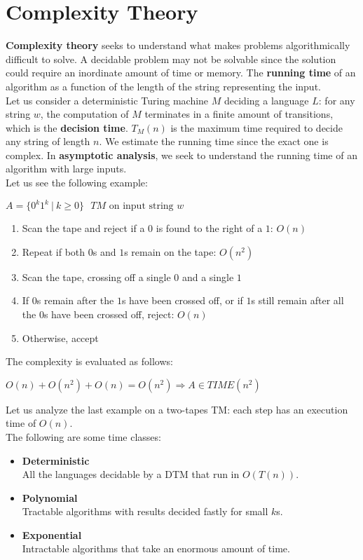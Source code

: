 \documentclass{article}
\begin{document}
\section{Complexity Theory}
\textbf{Complexity theory} seeks to understand what makes problems algorithmically difficult to solve. A decidable problem may not be solvable since the solution could require an inordinate amount of time or memory. The \textbf{running time} of an algorithm as a function of the length of the string representing the input. \\
Let us consider a deterministic Turing machine $M$ deciding a language $L$: for any string $w$, the computation of $M$ terminates in a finite amount of transitions, which is the \textbf{decision time}. $T_M(n)$ is the maximum time required to decide any string of length $n$. We estimate the running time since the exact one is complex. In \textbf{asymptotic analysis}, we seek to understand the running time of an algorithm with large inputs. \\
Let us see the following example:
\begin{center}
    $A = \{0^k1^k\ |\ k \geq 0\} \ \ \ TM \text{ on input string } w$
\end{center}
\begin{enumerate}
    \item Scan the tape and reject if a $0$ is found to the right of a $1$: $O(n)$
    \item Repeat if both $0$s and $1$s remain on the tape: $O(n^2)$
    \item Scan the tape, crossing off a single $0$ and a single $1$
    \item If $0$s remain after the $1$s have been crossed off, or if $1$s still remain after all the $0$s have been crossed off, reject: $O(n)$
    \item Otherwise, accept
\end{enumerate}
The complexity is evaluated as follows:
\begin{center}
    $O(n) + O(n^2) + O(n) = O(n^2) \Rightarrow A \in TIME(n^2)$
\end{center}
Let us analyze the last example on a two-tapes TM: each step has an execution time of $O(n)$. \\
The following are some time classes:
\begin{itemize}
    \item \textbf{Deterministic}
    \vspace{0.2cm} \\
    All the languages decidable by a DTM that run in $O(T(n))$.
    \item \textbf{Polynomial}
    \vspace{0.2cm} \\
    Tractable algorithms with results decided fastly for small $k$s.
    \item \textbf{Exponential}
    \vspace{0.2cm} \\
    Intractable algorithms that take an enormous amount of time.
\end{itemize}
\end{document}
